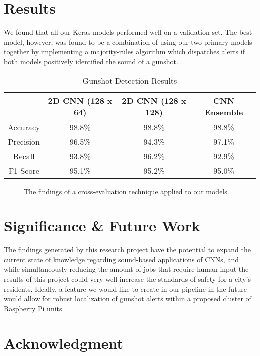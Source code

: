 \documentclass[conference]{IEEEtran}
\begin{document}
\section{Results}

We found that all our Keras models performed well on a validation set. The best model, however, was found to be a combination of using our two primary models together by implementing a majority-rules algorithm which dispatches alerts if both models positively identified the sound of a gunshot.

\begin{table}[htbp]
\caption{Gunshot Detection Results}
\begin{center}
\begin{tabular}{|c|c|c|c|}
\hline
& \multicolumn{1}{|c|}{\textbf{2D CNN (128 x 64)}} & \multicolumn{1}{|c|}{\textbf{2D CNN (128 x 128)}} & \multicolumn{1}{|c|}{\textbf{CNN Ensemble}} \\
\cline{2-4}
\hline
Accuracy & 98.8\% & 98.8\% & 98.8\%  \\
\hline
Precision & 96.5\% & 94.3\% & 97.1\% \\
\hline
Recall & 93.8\% & 96.2\% & 92.9\% \\
\hline
F1 Score & 95.1\% & 95.2\% & 95.0\% \\
\hline
\end{tabular}
\label{tab2}
\end{center}
\end{table}

\begin{figure}[htbp]
\caption{The findings of a cross-evaluation technique applied to our models.}
\label{fig2}
\end{figure}

\section{Significance \& Future Work}

The findings generated by this research project have the potential to expand the current state of knowledge regarding sound-based applications of CNNs, and while simultaneously reducing the amount of jobs that require human input the results of this project could very well increase the standards of safety for a city’s residents. Ideally, a feature we would like to create in our pipeline in the future would allow for robust localization of gunshot alerts within a proposed cluster of Raspberry Pi units.

\section*{Acknowledgment}
\end{document}
